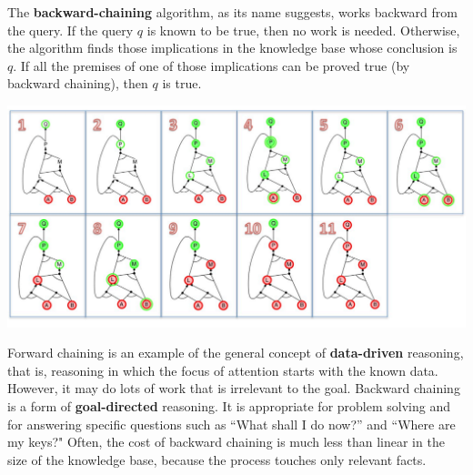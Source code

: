 The \textbf{backward-chaining} algorithm, as its name suggests, works backward from the query.  If the query $q$ is known to be true, then no work is needed. Otherwise, the algorithm finds those implications in the knowledge base whose conclusion is $q$.  If all the premises of
one of those implications can be proved true (by backward chaining), then $q$ is true.
\begin{center}
    \includegraphics[scale=0.8]{images/bkwrd exec.png}
\end{center}
Forward chaining is an example of the general concept of \textbf{data-driven} reasoning, that is, reasoning in which the focus of attention starts with the known data. However, it may do lots of work that is irrelevant to the goal.\newline\newline
Backward chaining is a form of \textbf{goal-directed} reasoning. It is appropriate for problem solving and for answering specific questions such as “What shall I do now?” and “Where are my keys?" Often, the cost of backward chaining is much less than linear in the size of the knowledge base, because the process touches only relevant facts.

